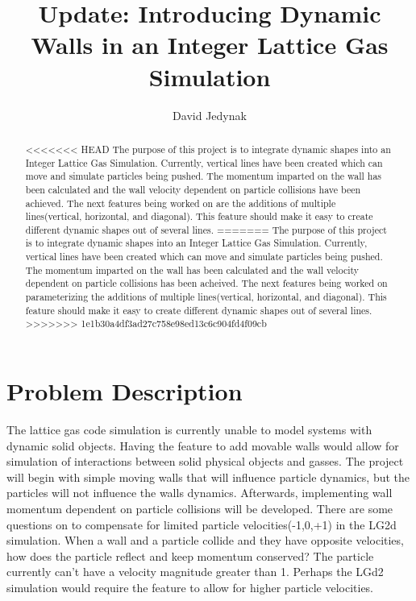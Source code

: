 \documentclass{article}
\begin{document}
\lstset{language=C} 
\title{Update: Introducing Dynamic Walls in an Integer Lattice Gas Simulation}
\author{David Jedynak}
\maketitle
\begin{abstract}
<<<<<<< HEAD
The purpose of this project is to integrate dynamic shapes into an Integer Lattice Gas Simulation. Currently, vertical lines have been created which can move and simulate particles being pushed. The momentum imparted on the wall has been calculated and the wall velocity dependent on particle collisions have been achieved. The next features being worked on are the additions of multiple lines(vertical, horizontal, and diagonal). This feature should make it easy to create different dynamic shapes out of several lines.   
=======
The purpose of this project is to integrate dynamic shapes into an Integer Lattice Gas Simulation. Currently, vertical lines have been created which can move and simulate particles being pushed. The momentum imparted on the wall has been calculated and the wall velocity dependent on particle collisions has been acheived. The next features being worked on parameterizing the additions of multiple lines(vertical, horizontal, and diagonal). This feature should make it easy to create different dynamic shapes out of several lines. 
>>>>>>> 1e1b30a4df3ad27c758e98ed13c6c904fd4f09cb
\end{abstract}
\section{Problem Description}
The lattice gas code simulation is currently unable to model systems with dynamic solid objects. Having the feature to add movable walls would allow for simulation of interactions between solid physical objects and gasses. The project will begin with simple moving walls that will influence particle dynamics, but the particles will not influence the walls dynamics. Afterwards, implementing wall momentum dependent on particle collisions will be developed. There are some questions on to compensate for limited particle velocities(-1,0,+1) in the LG2d simulation. When a wall and a particle collide and they have opposite velocities, how does the particle reflect and keep momentum conserved? The particle currently can't have a velocity magnitude greater than 1. Perhaps the LGd2 simulation would require the feature to allow for higher particle velocities.
\end{document}

